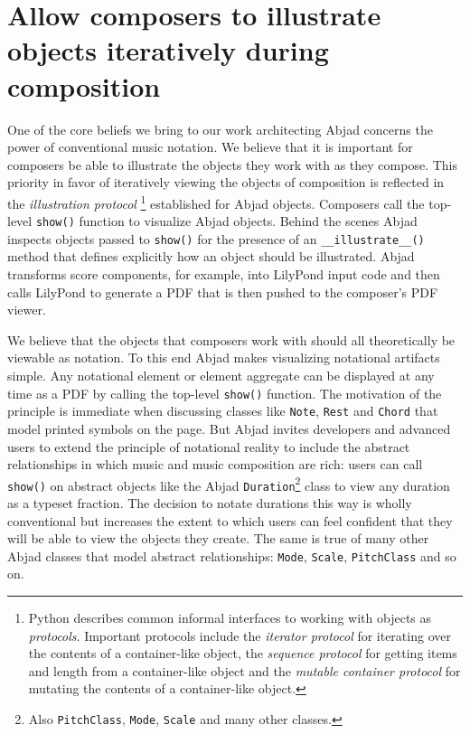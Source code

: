 \documentclass{article}
\begin{document}
\section{Allow composers to illustrate objects iteratively during composition }

One of the core beliefs we bring to our work architecting Abjad concerns the
power of conventional music notation. We believe that it is important for
composers be able to illustrate the objects they work with as they compose.
This priority in favor of iteratively viewing the objects of composition is
reflected in the \emph{illustration protocol} \footnote{Python describes common
informal interfaces to working with objects as \emph{protocols}. Important
protocols include the \emph{iterator protocol} for iterating over the contents
of a container-like object, the \emph{sequence protocol} for getting items and
length from a container-like object and the \emph{mutable container protocol}
for mutating the contents of a container-like object.} established for Abjad
objects. Composers call the top-level \texttt{show()} function to visualize
Abjad objects. Behind the scenes Abjad inspects objects passed to
\texttt{show()} for the presence of an \texttt{\_\_illustrate\_\_()} method
that defines explicitly how an object should be illustrated. Abjad transforms
score components, for example, into LilyPond input code and then calls LilyPond
to generate a PDF that is then pushed to the composer's PDF viewer.


\hrulefill\vspace{5pt}

We believe that the objects that composers work with should all theoretically
be viewable as notation. To this end Abjad makes visualizing notational
artifacts simple. Any notational element or element aggregate can be displayed
at any time as a PDF by calling the top-level \texttt{show()} function. The
motivation of the principle is immediate when discussing classes like
\texttt{Note}, \texttt{Rest} and \texttt{Chord} that model printed symbols on
the page. But Abjad invites developers and advanced users to extend the
principle of notational reality to include the abstract relationships in which
music and music composition are rich: users can call \texttt{show()} on
abstract objects like the Abjad \texttt{Duration}\footnote{Also
\texttt{PitchClass}, \texttt{Mode}, \texttt{Scale} and many other classes.}
class to view any duration as a typeset fraction. The decision to notate
durations this way is wholly conventional but increases the extent to which
users can feel confident that they will be able to view the objects they
create. The same is true of many other Abjad classes that model abstract
relationships: \texttt{Mode}, \texttt{Scale}, \texttt{PitchClass} and so on.
\end{document}
